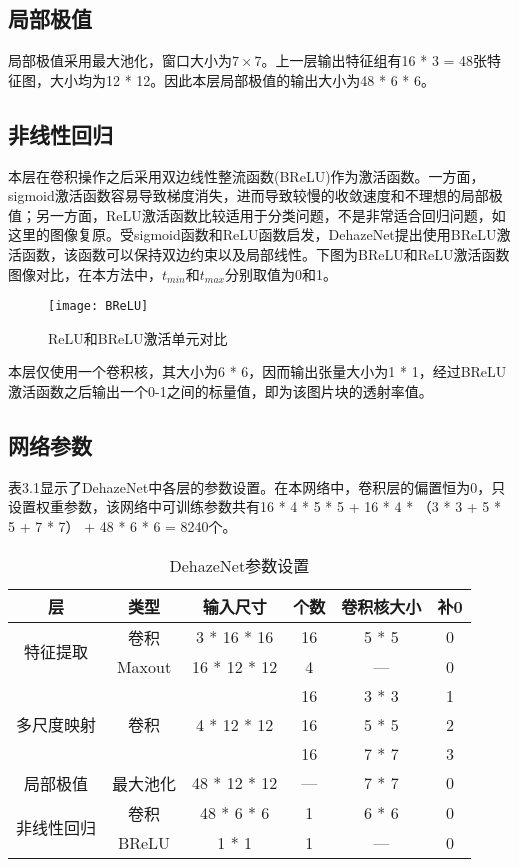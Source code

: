 \documentclass[a4paper, 12pt]{report}
\begin{document}
\subsection{局部极值\quad}
局部极值采用最大池化，窗口大小为$7\times 7$。上一层输出特征组有16 * 3 = 48张特征图，大小均为12 * 12。因此本层局部极值的输出大小为48 * 6 * 6。

\subsection{非线性回归\quad}
本层在卷积操作之后采用双边线性整流函数(BReLU)作为激活函数。一方面，sigmoid激活函数容易导致梯度消失，进而导致较慢的收敛速度和不理想的局部极值；另一方面，ReLU激活函数比较适用于分类问题，不是非常适合回归问题，如这里的图像复原。受sigmoid函数和ReLU函数启发，DehazeNet提出使用BReLU激活函数，该函数可以保持双边约束以及局部线性。下图为BReLU和ReLU激活函数图像对比，在本方法中，$t_{min}$和$t_{max}$分别取值为0和1。

\begin{figure}[H]
\centering
\texttt{[image: BReLU]}
\caption{ReLU和BReLU激活单元对比}
\end{figure}
本层仅使用一个卷积核，其大小为6 * 6，因而输出张量大小为1 * 1，经过BReLU激活函数之后输出一个0-1之间的标量值，即为该图片块的透射率值。

\subsection{网络参数\quad}
表3.1显示了DehazeNet中各层的参数设置。在本网络中，卷积层的偏置恒为0，只设置权重参数，该网络中可训练参数共有16 * 4 * 5 * 5 + 16 * 4 * （3 * 3 + 5 * 5 + 7 * 7） + 48 * 6 * 6 = 8240个。

\begin{table}[htbp]
  \centering
  \caption{DehazeNet参数设置}
    \begin{tabular}{c|c|c|c|c|c}
    \hline
    层     & 类型    & 输入尺寸  & 个数    & 卷积核大小 & 补0 \\
    \hline
    \multirow{2}[1]{*}{特征提取} & 卷积    & 3 * 16 * 16 & 16    & 5 * 5 & 0 \\
          & Maxout & 16 * 12 * 12 & 4     & —     & 0 \\
	\hline
    \multirow{3}[0]{*}{多尺度映射} & \multirow{3}[0]{*}{卷积} & \multirow{3}[0]{*}{4 * 12 * 12} & 16    & 3 * 3 & 1 \\
          &       &       & 16    & 5 * 5 & 2 \\
          &       &       & 16    & 7 * 7 & 3 \\
	\hline
    局部极值  & 最大池化  & 48 * 12 * 12 & —     & 7 * 7 & 0 \\
	\hline
    \multirow{2}[1]{*}{非线性回归} & 卷积    & 48 * 6 * 6 & 1     & 6 * 6 & 0 \\
          & BReLU & 1 * 1 & 1     & —     & 0 \\
    \hline
    \end{tabular}%
  \label{tab:3.1}%
\end{table}%
\end{document}
